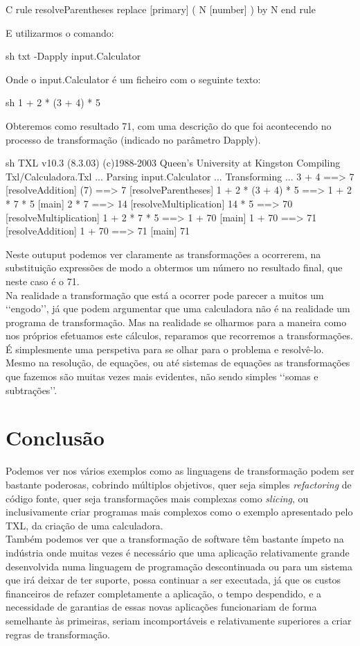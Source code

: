 \documentclass[runningheads,a4paper]{llncs}
\begin{document}
\begin{multicols}{2}
\begin{myCode}{C}
rule resolveParentheses
    replace [primary]
        ( N [number] )
    by
        N
end rule
\end{myCode}
E utilizarmos o comando: \\
\begin{myCode}{sh}
txt -Dapply input.Calculator
\end{myCode}
Onde o input.Calculator é um ficheiro com o seguinte texto:\\
\begin{myCode}{sh}
1 + 2 * (3 + 4) * 5 
\end{myCode}
Obteremos como resultado 71, com uma descrição do que foi acontecendo no processo de transformação (indicado no parâmetro Dapply).\\
\begin{myCode}{sh}
TXL v10.3 (8.3.03) (c)1988-2003 Queen's University at Kingston
Compiling Txl/Calculadora.Txl ...
Parsing input.Calculator ...
Transforming ...
3 + 4 ==> 7 [resolveAddition]
(7) ==> 7 [resolveParentheses]
1 + 2 * (3 + 4) * 5 ==> 1 + 2 * 7 * 5 [main]
2 * 7 ==> 14 [resolveMultiplication]
14 * 5 ==> 70 [resolveMultiplication]
1 + 2 * 7 * 5 ==> 1 + 70 [main]
1 + 70 ==> 71 [resolveAddition]
1 + 70 ==> 71 [main]
71
\end{myCode}
Neste outuput podemos ver claramente as transformações a ocorrerem, na substituição expressões de modo a obtermos um número no resultado final, que neste caso é o 71.\\
Na realidade a transformação que está a ocorrer pode parecer a muitos um \lq\lq{engodo}\rq\rq, já que podem argumentar que uma calculadora não é na realidade um programa de transformação. Mas na realidade se olharmos para a maneira como nos próprios efetuamos este cálculos, reparamos que recorremos a transformações. É simplesmente uma perspetiva para se olhar para o problema e resolvê-lo. Mesmo na resolução, de equações, ou até sistemas de equações as transformações que fazemos são muitas vezes mais evidentes, não sendo simples \lq\lq{somas e subtrações}\rq\rq.\\
\section{Conclusão}
Podemos ver nos vários exemplos como as linguagens de transformação podem ser bastante poderosas, cobrindo múltiplos objetivos, quer seja simples \emph{refactoring} de código fonte, quer seja transformações mais complexas como \emph{slicing}, ou inclusivamente criar programas mais complexos como o exemplo apresentado pelo TXL, da criação de uma calculadora.\\
Também podemos ver que a transformação de software têm bastante ímpeto na indústria onde muitas vezes é necessário que uma aplicação relativamente grande desenvolvida numa linguagem de programação descontinuada ou para um sistema que irá deixar de ter suporte, possa continuar a ser executada, já que os custos financeiros de refazer completamente a aplicação, o tempo despendido, e a necessidade de garantias de essas novas aplicações funcionariam de forma semelhante às primeiras, seriam incomportáveis e relativamente superiores a criar regras de transformação.



\end{multicols}
\end{document}

